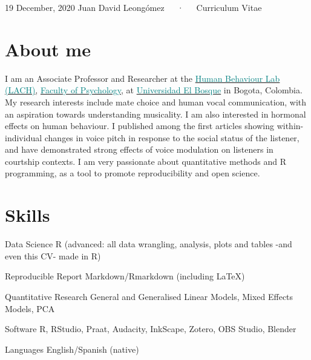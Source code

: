 \documentclass[11pt, a4paper]{awesome-cv}
\begin{document}
\makecvheader

\makecvfooter
  {19 December, 2020}
    {Juan David Leongómez~~~·~~~Curriculum Vitae}
  {\thepage}





\hypertarget{about-me}{%
\section{About me}\label{about-me}}

I am an Associate Professor and Researcher at the
\href{https://sites.google.com/unbosque.edu.co/lach-es}{\textcolor{teal}{Human Behaviour Lab (LACH)}},
\href{https://www.uelbosque.edu.co/psicologia}{\textcolor{teal}{Faculty of Psychology}},
at
\href{https://www.uelbosque.edu.co/}{\textcolor{teal}{Universidad El Bosque}}
in Bogota, Colombia. My research interests include mate choice and human
vocal communication, with an aspiration towards understanding
musicality. I am also interested in hormonal effects on human behaviour.
I published among the first articles showing within-individual changes
in voice pitch in response to the social status of the listener, and
have demonstrated strong effects of voice modulation on listeners in
courtship contexts. I am very passionate about quantitative methods and
R programming, as a tool to promote reproducibility and open science.

\hypertarget{skills}{%
\section{Skills}\label{skills}}

\begin{cvskills}
  \cvskill
    {Data Science}
    {R (advanced: all data wrangling, analysis, plots and tables -and even this CV- made in R)}

  \cvskill
    {Reproducible Report}
    {Markdown/Rmarkdown (including {\selectfont\LaTeX})}

  \cvskill
    {Quantitative Research}
    {General and Generalised Linear Models, Mixed Effects Models, PCA}

  \cvskill
    {Software}
    {R, RStudio, Praat, Audacity, InkScape, Zotero, OBS Studio, Blender}

  \cvskill
    {Languages}
    {English/Spanish (native)}
\end{cvskills}
\end{document}
